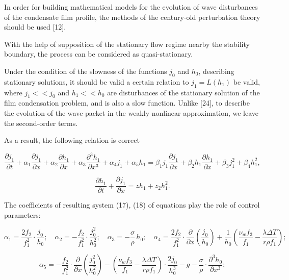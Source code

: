 \begin{multicols}{2}
In order for building mathematical models for the evolution of wave
disturbances of the condensate film profile, the methods of the
century-old perturbation theory should be used {[}12{]}.

With the help of supposition of the stationary flow regime nearby the
stability boundary, the process can be considered as quasi-stationary.

Under the condition of the slowness of the functions $j_0$ and $h_0$,
describing stationary solutions, it should be valid a certain relation
to $j_1=L(h_1)$ be valid, where $j_1<<j_0$ and $h_1<<h_0$ are
disturbances of the stationary solution of the film condensation
problem, and is also a slow function. Unlike {[}24{]}, to describe the
evolution of the wave packet in the weakly nonlinear approximation, we
leave the second-order terms.

As a result, the following relation is correct
\end{multicols}

\begin{equation}
\frac{\partial j_1}{\partial t}
+ \alpha_1 \frac{\partial j_1}{\partial x}
+ \alpha_2 \frac{\partial h_1}{\partial x}
+ \alpha_3 \frac{\partial^3 h_1}{\partial x^3}
+ \alpha_4 j_1
+ \alpha_5 h_1
=
\beta_1 j_1 \frac{\partial j_1}{\partial x}
+ \beta_2 h_1 \frac{\partial h_1}{\partial x}
+ \beta_3 j_1^2
+ \beta_4 h_1^2,
\end{equation}

\begin{equation}
\frac{\partial h_1}{\partial t} + \frac{\partial j_1}{\partial x}
= \mathit{zh}_1 + z_2 h_1^2.
\end{equation}

The coefficients of resulting system (17), (18) of equations play the
role of control parameters:

\begin{equation*}
\alpha_1 = \frac{2 f_2}{f_1^2} \cdot \frac{j_0}{h_0};\quad
\alpha_2 = - \frac{f_2}{f_1^2} \cdot \frac{j_0^2}{h_0^2};\quad
\alpha_3 = - \frac{\sigma}{\rho} \, h_0;\quad
\alpha_4 =
\frac{2 f_2}{f_1^2} \cdot \frac{\partial}{\partial x} \left( \frac{j_0}{h_0} \right)
+ \frac{1}{h_0} \left( \frac{\nu_w f_3}{f_1} - \frac{\lambda \Delta T}{r \rho f_1} \right);
\end{equation*}

\begin{equation}
\alpha_5 =
- \frac{f_2}{f_1^2} \cdot \frac{\partial}{\partial x} \left( \frac{j_0^2}{h_0^2} \right)
- \left( \frac{\nu_w f_3}{f_1} - \frac{\lambda \Delta T}{r \rho f_1} \right) \cdot \frac{2 j_0}{h_0^3}
- g
- \frac{\sigma}{\rho} \cdot \frac{\partial^3 h_0}{\partial x^3};
\end{equation}

